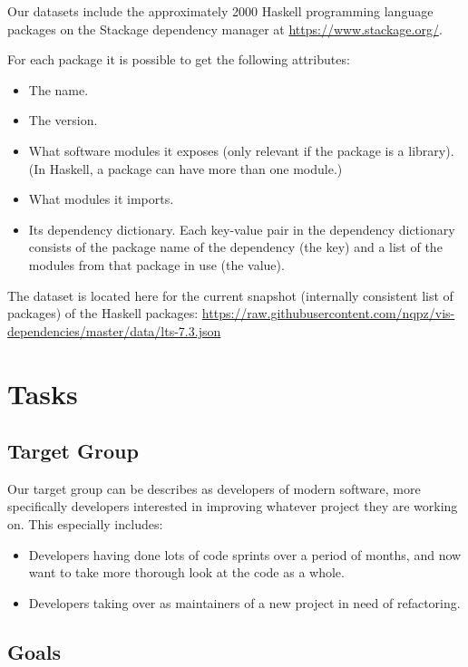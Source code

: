 \documentclass[a4paper,12pt]{article}
\begin{document}
Our datasets include the approximately 2000 Haskell programming language
packages on the Stackage dependency manager at \url{https://www.stackage.org/}.

For each package it is possible to get the following attributes:

\begin{itemize}
\item The name.
\item The version.
\item What software modules it exposes (only relevant if the package is a
library).  (In Haskell, a package can have more than one module.)
\item What modules it imports.
\item Its dependency dictionary.  Each key-value pair in the dependency
dictionary consists of the package name of the dependency (the key) and a list
of the modules from that package in use (the value).
\end{itemize}

The dataset is located here for the current snapshot (internally consistent list
of packages) of the Haskell packages:
\url{https://raw.githubusercontent.com/nqpz/vis-dependencies/master/data/lts-7.3.json}


\section{Tasks}

\subsection{Target Group}

Our target group can be describes as developers of modern software, more
specifically developers interested in improving whatever project they are
working on.  This especially includes:

\begin{itemize}
\item Developers having done lots of code sprints over a period of months, and
now want to take more thorough look at the code as a whole.
\item Developers taking over as maintainers of a new project in need of
refactoring.
\end{itemize}

\subsection{Goals}
\end{document}
